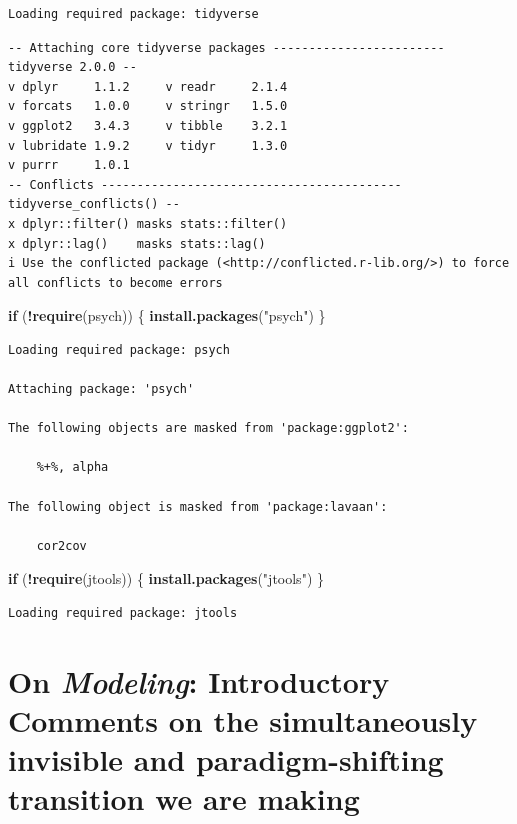 \documentclass[
  11pt,
]{book}
\newenvironment{Shaded}{\begin{snugshade}}{\end{snugshade}}
\newcommand{\ControlFlowTok}[1]{\textcolor[rgb]{0.27,0.27,0.27}{\textbf{#1}}}
\newcommand{\FunctionTok}[1]{\textcolor[rgb]{0.27,0.27,0.27}{\textbf{#1}}}
\newcommand{\NormalTok}[1]{#1}
\newcommand{\SpecialCharTok}[1]{\textcolor[rgb]{0.43,0.43,0.43}{\textbf{#1}}}
\newcommand{\StringTok}[1]{\textcolor[rgb]{0.5,0.5,0.5}{#1}}
\begin{document}
\begin{verbatim}
Loading required package: tidyverse
\end{verbatim}

\begin{verbatim}
-- Attaching core tidyverse packages ------------------------ tidyverse 2.0.0 --
v dplyr     1.1.2     v readr     2.1.4
v forcats   1.0.0     v stringr   1.5.0
v ggplot2   3.4.3     v tibble    3.2.1
v lubridate 1.9.2     v tidyr     1.3.0
v purrr     1.0.1     
-- Conflicts ------------------------------------------ tidyverse_conflicts() --
x dplyr::filter() masks stats::filter()
x dplyr::lag()    masks stats::lag()
i Use the conflicted package (<http://conflicted.r-lib.org/>) to force all conflicts to become errors
\end{verbatim}

\begin{Shaded}
\begin{Highlighting}[]
\ControlFlowTok{if}\NormalTok{ (}\SpecialCharTok{!}\FunctionTok{require}\NormalTok{(psych)) \{}
    \FunctionTok{install.packages}\NormalTok{(}\StringTok{"psych"}\NormalTok{)}
\NormalTok{\}}
\end{Highlighting}
\end{Shaded}

\begin{verbatim}
Loading required package: psych

Attaching package: 'psych'

The following objects are masked from 'package:ggplot2':

    %+%, alpha

The following object is masked from 'package:lavaan':

    cor2cov
\end{verbatim}

\begin{Shaded}
\begin{Highlighting}[]
\ControlFlowTok{if}\NormalTok{ (}\SpecialCharTok{!}\FunctionTok{require}\NormalTok{(jtools)) \{}
    \FunctionTok{install.packages}\NormalTok{(}\StringTok{"jtools"}\NormalTok{)}
\NormalTok{\}}
\end{Highlighting}
\end{Shaded}

\begin{verbatim}
Loading required package: jtools
\end{verbatim}

\hypertarget{on-modeling-introductory-comments-on-the-simultaneously-invisible-and-paradigm-shifting-transition-we-are-making}{%
\section{\texorpdfstring{On \emph{Modeling}: Introductory Comments on the simultaneously invisible and paradigm-shifting transition we are making}{On Modeling: Introductory Comments on the simultaneously invisible and paradigm-shifting transition we are making}}\label{on-modeling-introductory-comments-on-the-simultaneously-invisible-and-paradigm-shifting-transition-we-are-making}}
\end{document}
